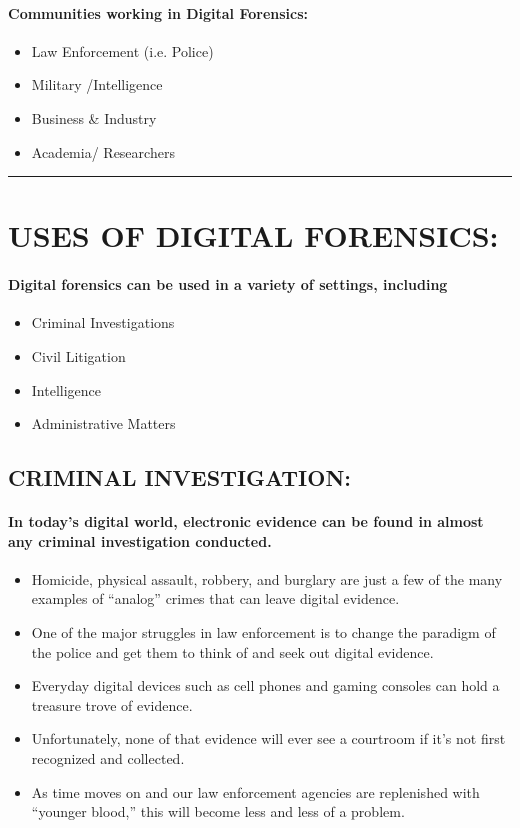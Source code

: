 \documentclass[10pt,british,english]{article}
\begin{document}
\paragraph{Communities working in Digital Forensics:}
\begin{itemize}
\item Law Enforcement (i.e. Police)
\item Military /Intelligence
\item Business \& Industry
\item Academia/ Researchers 
\end{itemize}
\rule[0.5ex]{1\columnwidth}{1pt}

\section{USES OF DIGITAL FORENSICS:}

\paragraph*{Digital forensics can be used in a variety of settings, including}
\begin{itemize}
\item Criminal Investigations
\item Civil Litigation
\item Intelligence
\item Administrative Matters
\end{itemize}

\subsection{CRIMINAL INVESTIGATION:}

\paragraph{In today\textquoteright s digital world, electronic evidence can
be found in almost any criminal investigation conducted. }
\begin{itemize}
\item Homicide, physical assault, robbery, and burglary are just a few of
the many examples of \textquotedblleft analog\textquotedblright{}
crimes that can leave digital evidence.
\item One of the major struggles in law enforcement is to change the paradigm
of the police and get them to think of and seek out digital evidence. 
\item Everyday digital devices such as cell phones and gaming consoles can
hold a treasure trove of evidence. 
\item Unfortunately, none of that evidence will ever see a courtroom if
it\textquoteright s not first recognized and collected.
\item As time moves on and our law enforcement agencies are replenished
with \textquotedblleft younger blood,\textquotedblright{} this will
become less and less of a problem.
\end{itemize}
\end{document}

